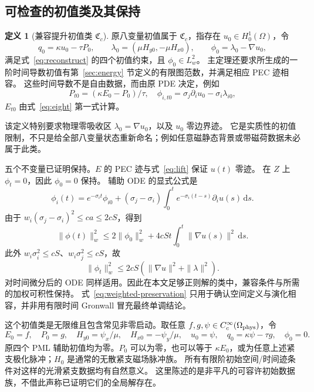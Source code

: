 \documentclass[UTF8,a4paper,11pt,fontset=none]{ctexart}
\numberwithin{equation}{section}
\theoremstyle{definition}
\theoremstyle{definition}
\newtheorem{definition}[theorem]{定义}
\newcommand{\Om}{\Omega}
\newcommand{\dd}{\,\mathrm d}
\begin{document}
\subsection{可检查的初值类及其保持}
\begin{definition}[兼容提升初值类 $\mathfrak C_c$]\label{def:data}
原八变量初值属于 $\mathfrak C_c$，指存在 $u_0\in H_0^1(\Om)$，令
\[
 q_0=\kappa u_0-\tau P_0,\qquad
 \lambda_0=(\mu H_{y0},-\mu H_{x0}),\qquad
 \phi_0=\lambda_0-\nabla u_0,
\]
满足式~\eqref{eq:reconstruct} 的四个初值约束，且 $\phi_0\in L_w^2$。
主定理还要求所生成的一阶时间导数初值有第~\ref{sec:energy} 节定义的有限图范数，并满足相应 PEC 迹相容。
这些时间导数不是自由数据，而由原 PDE 决定，例如
\[
 P_{t0}=(\kappa E_0-P_0)/\tau,\quad
 \phi_{i,t0}=\sigma_j\partial_i u_0-\sigma_i\lambda_{i0},
\]
$E_{t0}$ 由式~\eqref{eq:eight} 第一式计算。
\end{definition}
该定义特别要求物理零吸收区 $\lambda_0=\nabla u_0$，以及 $u_0$ 零边界迹。
它是实质性的初值限制，不只是给全部八变量状态重新命名；例如任意磁静态背景或带磁荷数据未必属于此类。

五个不变量已证明保持。$E$ 的 PEC 迹与式~\eqref{eq:lift} 保证 $u(t)$ 零迹。
在 $Z$ 上 $\phi_t=0$，因此 $\phi_0=0$ 保持。
辅助 ODE 的显式公式是
\begin{equation}\label{eq:memory-formula}
 \phi_i(t)=e^{-\sigma_i t}\phi_{i0}
 +(\sigma_j-\sigma_i)\int_0^te^{-\sigma_i(t-s)}\partial_i u(s)\dd s.
\end{equation}
由于
$w_i(\sigma_j-\sigma_i)^2\le ca\le2cS$，得到
\begin{equation}\label{eq:weighted-preservation}
 \|\phi(t)\|_w^2\le2\|\phi_0\|_w^2
 +4cSt\int_0^t\|\nabla u(s)\|^2\dd s.
\end{equation}
此外
$w_i\sigma_i^2\le cS$、$w_i\sigma_j^2\le cS$，故
\[
 \|\phi_t\|_w^2\le2cS(\|\nabla u\|^2+\|\lambda\|^2).
\]
对时间微分后的 ODE 同样适用。因此在本文足够正则解的类中，兼容条件与所需的加权可积性保持。
式~\eqref{eq:weighted-preservation} 只用于确认空间定义与演化相容，并非用有限时间 Gronwall 冒充最终单调结论。

这个初值类是无限维且包含常见非零启动。取任意
$f,g,\psi\in C_c^\infty(\Om_{\rm phys})$，令
\begin{equation}\label{eq:common-data}
 E_0=f,\quad P_0=g,\quad
 H_{y0}=\psi_x/\mu,\quad H_{x0}=-\psi_y/\mu,\quad
 u_0=\psi,\quad q_0=\kappa\psi-\tau g,\quad\phi_0=0.
\end{equation}
原四个 PML 辅助初值均为零。$P_0$ 可以为零，也可以等于 $\kappa E_0$，或为任意上述紧支极化脉冲；$H_0$ 是通常的无散紧支磁场脉冲族。
所有有限阶初始空间/时间迹条件对这样的光滑紧支数据均有自然意义。
这里陈述的是非平凡的可容许初始数据族，不借此声称已证明它们的全局解存在。
\end{document}
